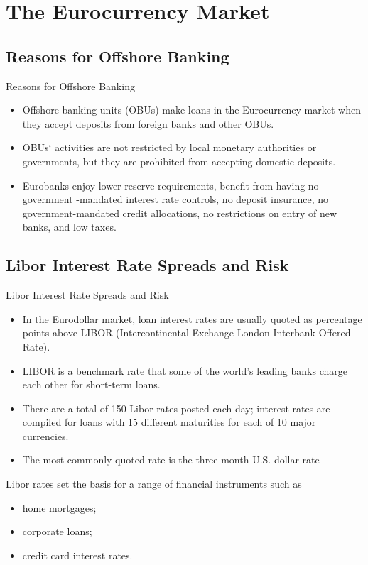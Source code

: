 \documentclass[international_finance_p2.tex]{subfiles}
\begin{document}
\section{The Eurocurrency Market}

\subsection{Reasons for Offshore Banking}
\begin{frame}{Reasons for Offshore Banking}
\begin{itemize}[<+->]
\item
Offshore banking units (OBUs) make loans in the Eurocurrency market when they accept deposits from foreign banks and other OBUs.
\item
OBUs` activities are not restricted by local monetary authorities or governments, but they are prohibited from accepting domestic deposits.
\item
Eurobanks enjoy lower reserve requirements, benefit from having no government -mandated interest rate controls, no deposit insurance, no government-mandated credit allocations, no restrictions on entry of new banks, and low taxes. 

\end{itemize}
\end{frame}

\subsection{Libor Interest Rate Spreads and Risk}
\begin{frame}{Libor Interest Rate Spreads and Risk}
\begin{itemize}[<+->]
\item
In the Eurodollar market, loan interest rates are usually quoted as percentage points above LIBOR (Intercontinental Exchange London Interbank Offered Rate).
\item
LIBOR is a benchmark rate that some of the world’s leading banks charge each other for short-term loans. 
\item
There are a total of 150 Libor rates posted each day; interest rates are compiled for loans with 15 different maturities for each of 10 major currencies. 
\item
The most commonly quoted rate is the three-month U.S. dollar rate

\end{itemize}
\end{frame}
\begin{frame}{Libor rates set the basis for a range of financial instruments such as}
\begin{itemize}[<+->]
\item
home mortgages;
\item
corporate loans;
\item
credit card interest rates.
\end{itemize}
\end{frame}
\end{document}
